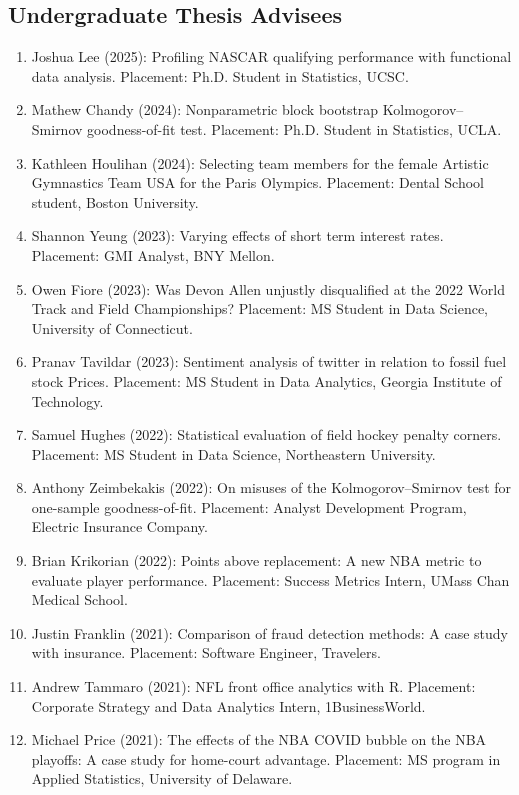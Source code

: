 \documentclass[Statistics]{vita}
\begin{document}
\begin{vita}
    \subsection{Undergraduate Thesis Advisees}
    \begin{enumerate}
    \item Joshua Lee (2025): Profiling NASCAR qualifying performance with functional data analysis. Placement: Ph.D. Student in Statistics, UCSC.
    \item Mathew Chandy (2024): Nonparametric block bootstrap Kolmogorov--Smirnov goodness-of-fit test. Placement: Ph.D. Student in Statistics, UCLA.
    \item Kathleen Houlihan (2024): Selecting team members for the female Artistic Gymnastics Team USA for the Paris Olympics. Placement: Dental School student, Boston University.
    \item Shannon Yeung (2023): Varying effects of short term interest rates. Placement: GMI Analyst, BNY Mellon.
    \item Owen Fiore (2023): Was Devon Allen unjustly disqualified at the 2022 World Track and Field Championships? Placement: MS Student in Data Science, University of Connecticut.
    \item Pranav Tavildar (2023): Sentiment analysis of twitter in relation to fossil fuel stock Prices. Placement: MS Student in Data Analytics, Georgia Institute of Technology.
    \item Samuel Hughes (2022): Statistical evaluation of field hockey penalty corners. Placement: MS Student in Data Science, Northeastern University.
    \item Anthony Zeimbekakis (2022): On misuses of the Kolmogorov--Smirnov test for one-sample goodness-of-fit. Placement: Analyst Development Program, Electric Insurance Company.
    \item Brian Krikorian (2022): Points above replacement: A new NBA metric to evaluate player performance. Placement: Success Metrics Intern, UMass Chan Medical School.
    \item Justin Franklin (2021): Comparison of fraud detection methods: A case study with insurance. Placement: Software Engineer, Travelers.
    \item Andrew Tammaro (2021): NFL front office analytics with R. Placement: Corporate Strategy and Data Analytics Intern, 1BusinessWorld.
    \item Michael Price (2021): The effects of the NBA COVID bubble on the NBA playoffs: A case study for home-court advantage. Placement: MS program in Applied Statistics, University of Delaware.

\end{enumerate}
\end{vita}
\end{document}

